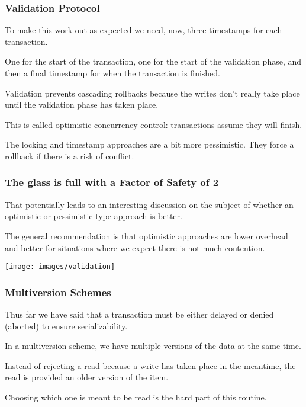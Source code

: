 \begin{frame}
\frametitle{Validation Protocol}

To make this work out as expected we need, now, three timestamps for each transaction. 

One for the start of the transaction, one for the start of the validation phase, and then a final timestamp for when the transaction is finished.

Validation prevents cascading rollbacks because the writes don't really take place until the validation phase has taken place.

This is called \alert{optimistic concurrency control}: transactions assume they will finish. 

The locking and timestamp approaches are a bit more pessimistic. They force a rollback if there is a risk of conflict.

\end{frame}



\begin{frame}
\frametitle{The glass is full with a Factor of Safety of 2}

That potentially leads to an interesting discussion on the subject of whether an optimistic or pessimistic type approach is better.

The general recommendation is that optimistic approaches are lower overhead and better for situations where we expect there is not much contention.

\begin{center}
	\texttt{[image: images/validation]}
\end{center}

\end{frame}

\begin{frame}
\frametitle{Multiversion Schemes}

Thus far we have said that a transaction must be either delayed or denied (aborted) to ensure serializability. 

In a multiversion scheme, we have multiple versions of the data at the same time.

Instead of rejecting a read because a write has taken place in the meantime, the read is provided an older version of the item. 

Choosing which one is meant to be read is the hard part of this routine.
\end{frame}

